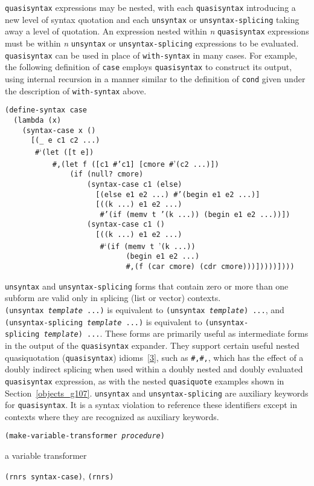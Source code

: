\texttt{quasisyntax} expressions may be nested, with each \texttt{quasisyntax}
introducing a new level of syntax quotation and each \texttt{unsyntax} or
\texttt{unsyntax-splicing} taking away a level of quotation.
An expression nested within \textit{n} \texttt{quasisyntax} expressions must
be within \textit{n} \texttt{unsyntax} or \texttt{unsyntax-splicing} expressions to
be evaluated.
\texttt{quasisyntax} can be used in place of \texttt{with-syntax} in many
cases.
For example, the following definition of
\label{syntax_s41}\texttt{case} employs \texttt{quasisyntax} to
construct its output, using internal recursion in a manner similar to the
definition of \texttt{cond} given under the description of
\texttt{with-syntax} above.

\begin{alltt}
(define-syntax case\label{syntax_defn_case}
  (lambda (x)
    (syntax-case x ()
      [(\_{} e c1 c2 ...)
       \#{}`(let ([t e])
           \#{},(let f ([c1 \#{}'c1] [cmore \#{}'(c2 ...)])
               (if (null? cmore)
                   (syntax-case c1 (else)
                     [(else e1 e2 ...) \#{}'(begin e1 e2 ...)]
                     [((k ...) e1 e2 ...)
                      \#{}'(if (memv t '(k ...)) (begin e1 e2 ...))])
                   (syntax-case c1 ()
                     [((k ...) e1 e2 ...)
                      \#{}`(if (memv t '(k ...))
                            (begin e1 e2 ...)
                            \#{},(f (car cmore) (cdr cmore)))]))))])))
\end{alltt}

\texttt{unsyntax} and \texttt{unsyntax-splicing} forms that contain
zero or more than
one subform are valid only in splicing (list or vector) contexts.
\texttt{(unsyntax \textit{template} ...)} is equivalent to
\texttt{(unsyntax \textit{template}) ...}, and
\texttt{(unsyntax-splicing \textit{template} ...)} is equivalent to
\texttt{(unsyntax-splicing \textit{template}) ...}.
These forms are primarily useful as intermediate forms in the output
of the \texttt{quasisyntax} expander.
They support certain useful nested quasiquotation (\texttt{quasisyntax})
idioms [\hyperref[bibliography_g221]{3}], such as \texttt{\#{},\@{}\#{},\@{}}, which has the
effect of a doubly indirect splicing when used within a doubly nested
and doubly evaluated \texttt{quasisyntax} expression, as with the
nested \texttt{quasiquote} examples shown in Section \ref{objects_g107}.
\texttt{unsyntax} and \texttt{unsyntax-splicing} are auxiliary keywords for
\texttt{quasisyntax}.
It is a syntax violation to reference these identifiers except in contexts
where they are recognized as auxiliary keywords.
\begin{description}

\label{syntax_s42}\label{syntax_desc_make_variable_transformer}
\item[procedure] \texttt{(make-variable-transformer \textit{procedure})}



\item[returns] a variable transformer


\item[libraries] \texttt{(rnrs syntax-case)}, \texttt{(rnrs)}
\end{description}


